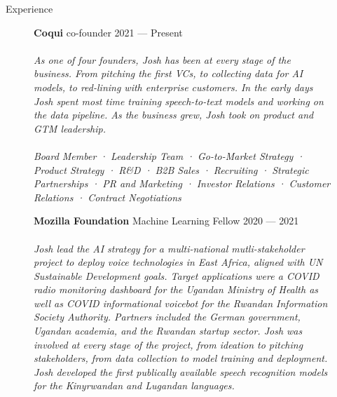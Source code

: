 \documentclass{resume} %
\begin{document}
\begin{rSection}{Experience}

  \begin{figure}[H]
    \begin{minipage}{0.2\textwidth}
      \centering
        
      \end{minipage}
      \begin{minipage}{0.8\textwidth}
          {\bf Coqui} \hfill  co-founder \hfill {} {2021 --- Present} \\ \\
          \textit{As one of four founders, Josh has been at every stage of the business. From pitching the first VCs, to collecting data for AI models, to red-lining with enterprise customers. In the early days Josh spent most time training speech-to-text models and working on the data pipeline. As the business grew, Josh took on product and GTM leadership.} \\ \\
          \textit{Board Member · Leadership Team · Go-to-Market Strategy · Product Strategy · R\&D · B2B Sales · Recruiting · Strategic Partnerships · PR and Marketing · Investor Relations · Customer Relations · Contract Negotiations} \\
      \end{minipage}
  \end{figure}

  \begin{figure}[H]
    \begin{minipage}{0.2\textwidth}
      \centering
      
    \end{minipage}
    \begin{minipage}{0.8\textwidth}
      {\bf Mozilla Foundation} \hfill Machine Learning Fellow \hfill {2020 --- 2021} \\ \\
      \textit{Josh lead the AI strategy for a multi-national mutli-stakeholder project to deploy voice technologies in East Africa, aligned with UN Sustainable Development goals. Target applications were a COVID radio monitoring dashboard for the Ugandan Ministry of Health as well as COVID informational voicebot for the Rwandan Information Society Authority. Partners included the German government, Ugandan academia, and the Rwandan startup sector. Josh was involved at every stage of the project, from ideation to pitching stakeholders, from data collection to model training and deployment. Josh developed the first publically available speech recognition models for the Kinyrwandan and Lugandan languages.} \\
    \end{minipage}
  \end{figure}


\end{rSection}
\end{document}
